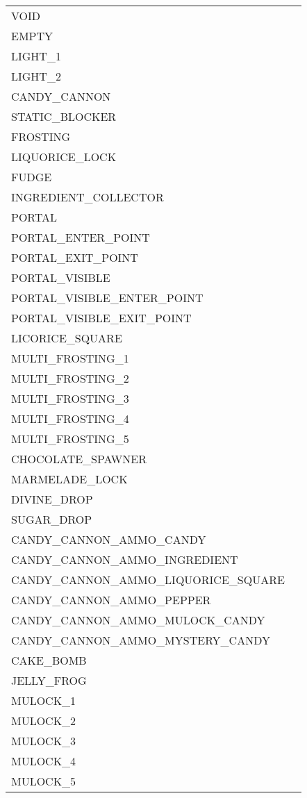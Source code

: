 \begin{tabular}{l l}
    VOID \\   
    EMPTY \\   
    LIGHT\_1 \\   
    LIGHT\_2 \\   
    CANDY\_CANNON \\ 
    STATIC\_BLOCKER \\ 
    FROSTING \\   
    LIQUORICE\_LOCK \\   
    FUDGE \\  
    INGREDIENT\_COLLECTOR \\   
    PORTAL \\ 
    PORTAL\_ENTER\_POINT \\   
    PORTAL\_EXIT\_POINT \\  
    PORTAL\_VISIBLE \\  
    PORTAL\_VISIBLE\_ENTER\_POINT \\ 
    PORTAL\_VISIBLE\_EXIT\_POINT \\  
    LICORICE\_SQUARE \\   
    MULTI\_FROSTING\_1 \\   
    MULTI\_FROSTING\_2 \\  
    MULTI\_FROSTING\_3 \\   
    MULTI\_FROSTING\_4 \\
    MULTI\_FROSTING\_5 \\ 
    CHOCOLATE\_SPAWNER \\   
    MARMELADE\_LOCK \\   
    DIVINE\_DROP \\   
    SUGAR\_DROP \\ 
    CANDY\_CANNON\_AMMO\_CANDY \\ 
    CANDY\_CANNON\_AMMO\_INGREDIENT \\ 
    CANDY\_CANNON\_AMMO\_LIQUORICE\_SQUARE \\ 
    CANDY\_CANNON\_AMMO\_PEPPER \\ 
    CANDY\_CANNON\_AMMO\_MULOCK\_CANDY \\ 
    CANDY\_CANNON\_AMMO\_MYSTERY\_CANDY \\ 
    CAKE\_BOMB \\   
    JELLY\_FROG \\ 
    MULOCK\_1 \\   
    MULOCK\_2 \\   
    MULOCK\_3 \\   
    MULOCK\_4 \\   
    MULOCK\_5 \\   
    

        
    \bottomrule
    \end{tabular}
